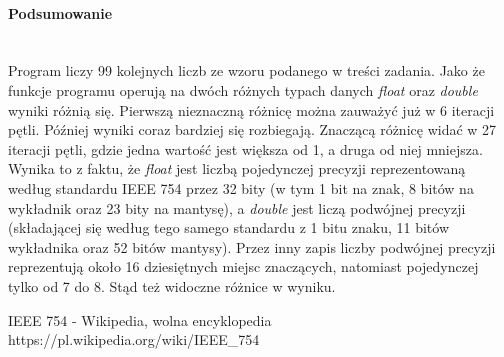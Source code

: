 \paragraph{Podsumowanie} ~\\
Program liczy 99 kolejnych liczb ze wzoru podanego w treści zadania.
Jako że funkcje programu operują na dwóch różnych typach danych \textit{float} oraz \textit{double} wyniki różnią się.
Pierwszą nieznaczną różnicę można zauważyć już w 6 iteracji pętli.
Później wyniki coraz bardziej się rozbiegają.
Znaczącą różnicę widać w 27 iteracji pętli, gdzie jedna wartość jest większa od 1, a druga od niej mniejsza.
Wynika to z faktu, że \textit{float} jest liczbą pojedynczej precyzji reprezentowaną według standardu IEEE 754\nocite{WikiIEEE754} przez 32 bity (w tym 1 bit na znak, 8 bitów na wykładnik oraz 23 bity na mantysę), a \textit{double} jest liczą podwójnej precyzji (składającej się według tego samego standardu z 1 bitu znaku, 11 bitów wykładnika oraz 52 bitów mantysy).
Przez inny zapis liczby podwójnej precyzji reprezentują około 16 dziesiętnych miejsc znaczących, natomiast pojedynczej tylko od 7 do 8.
Stąd też widoczne różnice w wyniku.

\begin{thebibliography}{9}
   IEEE 754 - Wikipedia, wolna encyklopedia https://pl.wikipedia.org/wiki/IEEE\_754
\end{thebibliography}
